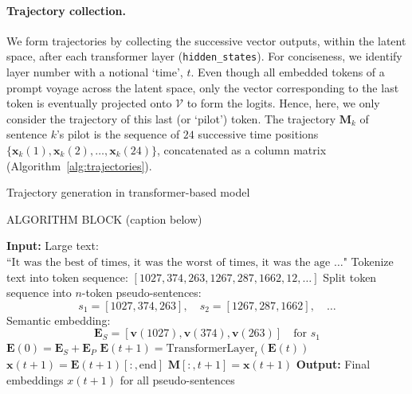 \documentclass{article} %
\def\vv{{\bm{v}}}
\def\vx{{\bm{x}}}
\def\mE{{\bm{E}}}
\def\mM{{\bm{M}}}
\def\mP{{\bm{P}}}
\begin{document}
\paragraph{Trajectory collection.}
We form trajectories by collecting the successive vector outputs, within the latent space, after each transformer layer (\verb|hidden_states|).
For conciseness, we identify layer number with a notional `time', $t$.
Even though all embedded tokens of a prompt voyage across the latent space, only the vector corresponding to the last token is eventually projected onto $\mathcal{V}$ to form the logits.
Hence, here, we only consider the trajectory of this last (or `pilot') token.
The trajectory $\mM_k$ of sentence $k$'s pilot is the sequence of $24$ successive time positions $\{ \vx_k (1), \vx_k(2), \ldots, \vx_k(24) \}$, concatenated as a column matrix (Algorithm~\ref{alg:trajectories}).

\begin{algorithm}[h]
\caption{Trajectory generation in transformer-based model}
\begin{algorithmic}[1]
ALGORITHM BLOCK (caption below)

\label{alg:trajectories}
\STATE \textbf{Input:} Large text: $\text{``It was the best of times, it was the worst of times, it was the age \ldots"}$
\STATE Tokenize text into token sequence: $[1027, 374, 263, 1267, 287, 1662, 12, \ldots]$
\STATE Split token sequence into $n$-token pseudo-sentences:
\[
  s_1 = [1027, 374, 263], \quad s_2 = [1267, 287, 1662], \quad \ldots
\]
    \STATE Semantic embedding: 
    \[
      \mE_S = [\vv(1027), \vv(374), \vv(263)] \quad \text{for } s_1
    \]
    \STATE $\mE(0) = \mE_S + \mE_P$ \COMMENT{add positional embeddings $\mP$}
        \STATE 
        $
          \mE(t+1) = \text{TransformerLayer}_t (\mE(t))
        $ 
        \STATE 
        $          \vx(t+1) = \mE(t+1)[:, \text{end}]
        $ 
        \STATE 
        $
          \mM[:, t+1] = \vx(t+1)
        $ 
    \ENDFOR
\ENDFOR
\STATE \textbf{Output:} Final embeddings $x(t+1)$ for all pseudo-sentences
\end{algorithmic}
\end{algorithm}
\end{document}
